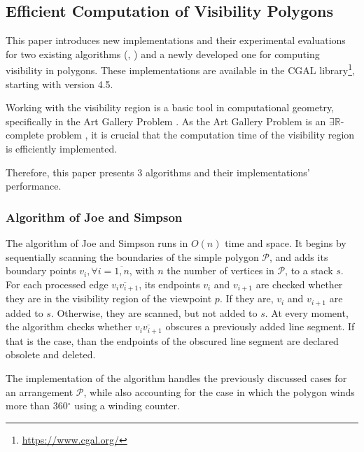 \subsection{Efficient Computation of Visibility Polygons \cite{DBLP:journals/corr/BungiuHHHK14}}
This paper \cite{DBLP:journals/corr/BungiuHHHK14} introduces new implementations and their experimental evaluations for two existing algorithms (\cite{joe1987corrections}, \cite{asano1985efficient}) and a newly developed one for computing visibility in polygons. These implementations are available in the CGAL library\footnote{\url{https://www.cgal.org/}}, starting with version 4.5.

Working with the visibility region is a basic tool in computational geometry, specifically in the Art Gallery Problem \cite{o1987art}. As the Art Gallery Problem \cite{o1987art} is an $\exists \mathbb R$-complete problem \cite{abrahamsen2021art}, it is crucial that the computation time of the visibility region is efficiently implemented. 

Therefore, this paper presents 3 algorithms and their implementations' performance.

\subsubsection{Algorithm of Joe and Simpson \cite{joe1987corrections}}
The algorithm of Joe and Simpson \cite{joe1987corrections} runs in $O(n)$ time and space. It begins by sequentially scanning the boundaries of the simple polygon $\mathcal P$, and adds its boundary points $v_i, \forall i = \overline{1, n}$, with $n$ the number of vertices in $\mathcal P$, to a stack $s$. For each processed edge $\overline{v_iv_{i + 1}}$, its endpoints $v_i$ and $v_{i + 1}$ are checked whether they are in the visibility region of the viewpoint $p$. If they are, $v_i$ and $v_{i + 1}$ are added to $s$. Otherwise, they are scanned, but not added to $s$. At every moment, the algorithm checks whether $\overline{v_iv_{i + 1}}$ obscures a previously added line segment. If that is the case, than the endpoints of the obscured line segment are declared obsolete and deleted. 

The implementation of the algorithm handles the previously discussed cases for an arrangement $\mathcal P$, while also accounting for the case in which the polygon winds more than 360$^\circ$ using a winding counter.

